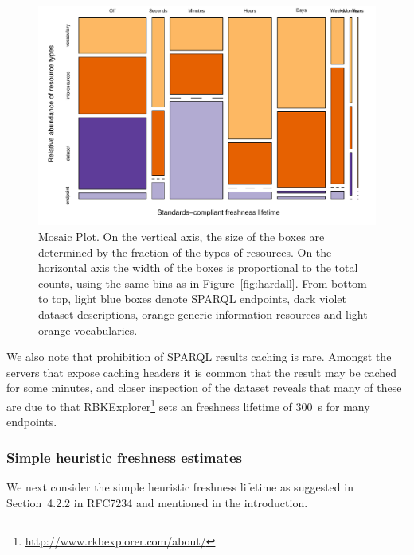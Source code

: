 \documentclass{llncs}
\begin{document}
\begin{figure}[ht]
  \centerline{%
    \includegraphics[width=.9\textwidth]{hardtable.pdf}}
  \caption{Mosaic Plot. On the vertical axis, the size of the boxes
    are determined by the fraction of the types of resources. On the
    horizontal axis the width of the boxes is proportional to the
    total counts, using the same bins as in
    Figure~\ref{fig:hardall}. From bottom to top, light blue boxes
    denote SPARQL endpoints, dark violet dataset descriptions, orange
    generic information resources and light orange vocabularies.}
  \label{fig:hardtable}
\end{figure}


We also note that prohibition of SPARQL results caching is rare.
Amongst the servers that expose caching headers it is common
that the result may be cached for some minutes, and closer inspection
of the dataset reveals that many of these are due to that
RBKExplorer\footnote{\url{http://www.rkbexplorer.com/about/}} sets an
freshness lifetime of 300~s for many endpoints.

\subsubsection{Simple heuristic freshness estimates}\label{sec:simplefresh}

We next consider the simple heuristic freshness lifetime as suggested in
Section~4.2.2 in RFC7234 and mentioned in the introduction.
\end{document}
